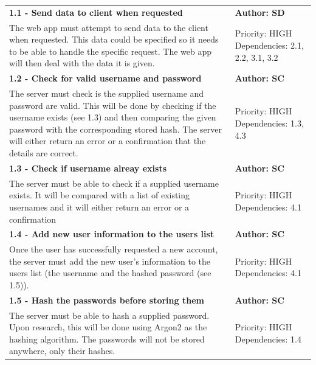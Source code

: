 \documentclass[11pt]{report}
\begin{document}
\begin{center}

\begin{longtable}{| p{13cm} | p{3cm} |}
\endfirsthead
\endlastfoot

\multicolumn{2}{c}{\textit{Continued from last page}}
\endhead

\multicolumn{2}{c}{\textit{Continued on next page}}
\endfoot

\hline
\multicolumn{2}{|l|}{\textbf{\textit{1 - Server}}} \\
\hline
\textbf{1.1 - Send data to client when requested} & \textbf{Author: SD} \\
\hline
The web app must attempt to send data to the client when requested. This data could be specified so it needs to be able to handle the specific request. The web app will then deal with the data it is given. & 
Priority: HIGH Dependencies: 2.1, 2.2, 3.1, 3.2\\
\hline
\textbf{1.2 - Check for valid username and password} & \textbf{Author: SC} \\
\hline
The server must check is the supplied username and password are valid. This will be done by checking if the username exists (see 1.3) and then comparing the given password with the corresponding stored hash. The server will either return an error or a confirmation that the details are correct. &
Priority: HIGH Dependencies: 1.3, 4.3\\
\hline
\textbf{1.3 - Check if username alreay exists} & \textbf{Author: SC} \\
\hline
The server must be able to check if a supplied username exists. It will be compared with a list of existing usernames and it will either return an error or a confirmation &
Priority: HIGH Dependencies: 4.1\\
\hline
\textbf{1.4 - Add new user information to the users list} & \textbf{Author: SC} \\
\hline
Once the user has successfully requested a new account, the server must add the new user’s information to the users list (the username and the hashed password (see 1.5)). &
Priority: HIGH Dependencies: 4.1\\
\hline
\textbf{1.5 - Hash the passwords before storing them} & \textbf{Author: SC} \\
\hline
The server must be able to hash a supplied password. Upon research, this will be done using Argon2 as the hashing algorithm. The passwords will not be stored anywhere, only their hashes.&
Priority: HIGH Dependencies: 1.4\\
\hline


\end{longtable}
\end{center}
\end{document}
